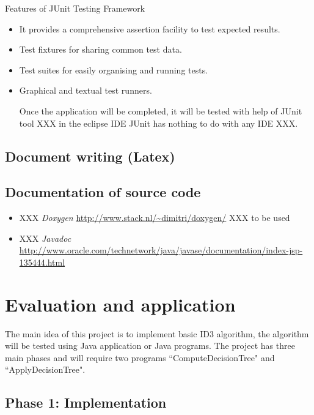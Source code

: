 \documentclass{report}
\begin{document}
Features of JUnit Testing Framework
\begin{itemize}

\item It provides a comprehensive assertion facility to test expected results.
\item Test fixtures for sharing common test data.
\item Test suites for easily organising and running tests.
\item Graphical and textual test runners.

Once the application will be completed, it will be tested with help of JUnit tool XXX in the eclipse IDE  JUnit has nothing to do with any IDE XXX.


\end{itemize}

\subsection{Document writing (Latex)}
\label{sec:latex}

\subsection{Documentation of source code}
\label{sec:documentsource}

\begin{itemize}
\item XXX \textit{Doxygen} \url{http://www.stack.nl/~dimitri/doxygen/} XXX to be used
\item XXX \textit{Javadoc} \url{http://www.oracle.com/technetwork/java/javase/documentation/index-jsp-135444.html}
\end{itemize}





\section{Evaluation and application}
\label{sec:eval}

The main idea of this project is to implement basic ID3 algorithm, the algorithm will be tested using Java application or Java programs. The project has three main phases and will require two programs ``ComputeDecisionTree" and ``ApplyDecisionTree". 


\subsection{Phase 1: Implementation}
\label{sec:phase1}
\end{document}

